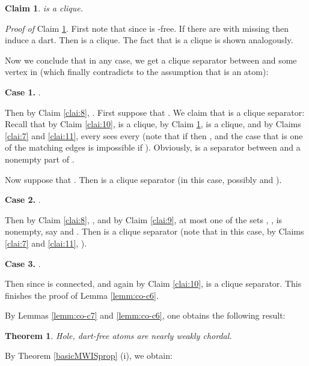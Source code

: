 \documentclass[11pt]{article}
\newcommand{\qed}{\hfill }
\newcommand{\0}{\text{ has a co-join to }}
\newcommand{\1}{\text{ has a join to }}
\newtheorem{theo}{Theorem}
\newtheorem{clai}{Claim}[section]
\begin{document}
\begin{clai}\label{clai:12}
 is a clique.
\end{clai}

\noindent
{\em Proof of} Claim \ref{clai:12}. First note that  since  is -free. If there are  with  missing  then  induce a dart. Then  is a clique. The fact that  is a clique is shown analogously. 


\medskip

Now we conclude that in any case, we get a clique separator between  and some vertex in  (which finally contradicts to the assumption that  is an atom):

\medskip

\noindent
{\bf Case 1.} . 

\medskip

Then by Claim \ref{clai:8}, .
First suppose that . We claim that  is a clique separator: Recall that by Claim \ref{clai:10},  is a clique, by Claim \ref{clai:12},  is a clique, and by Claims \ref{clai:7} and \ref{clai:11}, every  sees every  (note that if  then , and the case that  is one of the matching edges is impossible if ). Obviously,  is a separator between  and a nonempty part of .

Now suppose that . Then  is a clique separator (in this case, possibly  and ).

\medskip

\noindent
{\bf Case 2.} . 

\medskip

Then by Claim \ref{clai:8}, , and by Claim \ref{clai:9}, at most one of the sets , ,  is nonempty, say  and . Then  is a clique separator (note that in this case, by Claims \ref{clai:7} and \ref{clai:11}, ).

\medskip
\noindent
{\bf Case 3.} . 

\medskip

Then  since  is connected, and again by Claim \ref{clai:10},  is a clique separator.
This finishes the proof of Lemma \ref{lemm:co-c6}.             
\qed

\medskip

By Lemmas \ref{lemm:co-c7} and \ref{lemm:co-c6}, one obtains the following result:

\begin{theo}\label{holedartnearlywc}
Hole, dart-free atoms are nearly weakly chordal.
\end{theo}

By Theorem \ref{basicMWISprop} (i), we obtain:
\end{document}
